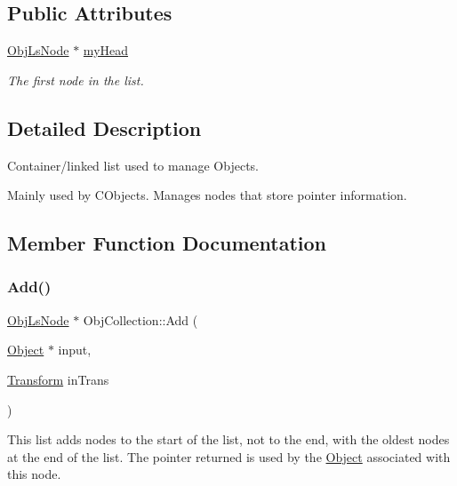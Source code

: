 \subsection*{Public Attributes}
\begin{DoxyCompactItemize}
\item 
\hypertarget{class_obj_collection_add6095e3454bd7ab4f288ac842cc7fce}{}\label{class_obj_collection_add6095e3454bd7ab4f288ac842cc7fce} 
\hyperlink{struct_obj_ls_node}{Obj\+Ls\+Node} $\ast$ \hyperlink{class_obj_collection_add6095e3454bd7ab4f288ac842cc7fce}{my\+Head}
\begin{DoxyCompactList}\small\item\em The first node in the list. \end{DoxyCompactList}\end{DoxyCompactItemize}


\subsection{Detailed Description}
Container/linked list used to manage Objects. 

Mainly used by C\+Objects. Manages nodes that store pointer information. 

\subsection{Member Function Documentation}
\hypertarget{class_obj_collection_a0fc6d26772a3f657a41ca9360e65b33f}{}\label{class_obj_collection_a0fc6d26772a3f657a41ca9360e65b33f} 
\subsubsection{\texorpdfstring{Add()}{Add()}}
{\footnotesize\ttfamily \hyperlink{struct_obj_ls_node}{Obj\+Ls\+Node} $\ast$ Obj\+Collection\+::\+Add (\begin{DoxyParamCaption}\item[{\hyperlink{class_object}{Object} $\ast$}]{input,  }\item[{\hyperlink{class_transform}{Transform}}]{in\+Trans }\end{DoxyParamCaption})}



This list adds nodes to the start of the list, not to the end, with the oldest nodes at the end of the list. The pointer returned is used by the \hyperlink{class_object}{Object} associated with this node. 


